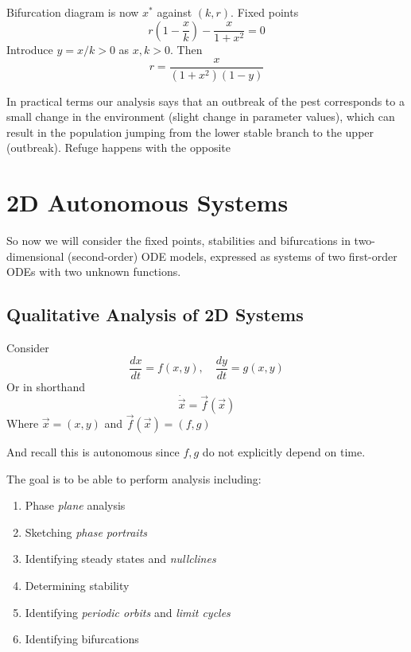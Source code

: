 \documentclass{/home/janmebows/Documents/LatexTemplates/myassignment}
\begin{document}


Bifurcation diagram is now $x^*$ against $(k,r)$. Fixed points 
\[r(1-\frac xk) - \frac{x}{1+x^2} = 0\]
Introduce $y=x/k > 0$ as $x,k>0$. Then
\[r = \frac{x}{(1+x^2)(1-y)}\]


In practical terms our analysis says that an outbreak of the pest corresponds to a small change in the environment (slight change in parameter values), which can result in the population jumping from the lower stable branch to the upper (outbreak). Refuge happens with the opposite


\section{2D Autonomous Systems}
So now we will consider the fixed points, stabilities and bifurcations in two-dimensional (second-order) ODE models, expressed as systems of two first-order ODEs with two unknown functions. 

\subsection{Qualitative Analysis of 2D Systems}
Consider
\[\frac{dx}{dt}= f(x,y), \quad \frac{dy}{dt} = g(x,y)\]
Or in shorthand
\[\dot{\vec x} = \vec f(\vec x)\]
Where $\vec x = (x,y)$ and $\vec f(\vec x) = \left(f,g\right)$

And recall this is autonomous since $f,g$ do not explicitly depend on time.


The goal is to be able to perform analysis including:
\begin{enumerate}
    \item Phase \textit{plane} analysis
    \item Sketching \textit{phase portraits}
    \item Identifying steady states and \textit{nullclines}
    \item Determining stability
    \item Identifying \textit{periodic orbits} and \textit{limit cycles}
    \item Identifying bifurcations
\end{enumerate}
\end{document}
